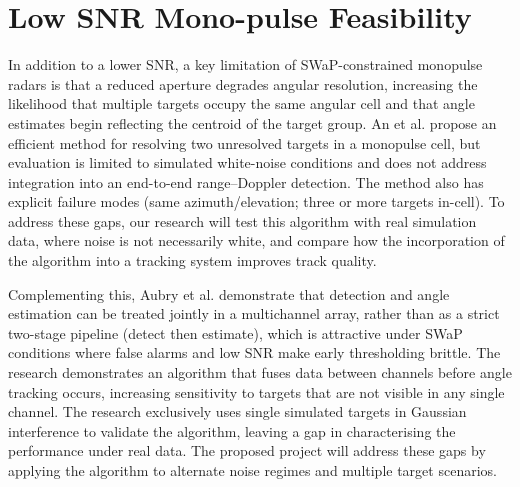 \section{Low SNR Mono-pulse Feasibility}

In addition to a lower SNR, a key limitation of SWaP-constrained monopulse radars is that a reduced aperture degrades angular resolution, increasing the likelihood that multiple targets occupy the same angular cell and that angle estimates begin reflecting the centroid of the target group. An et al. \cite{an2024_time_varying_angle_estimation_unresolved_extended_targets_monopulse} propose an efficient method for resolving two unresolved targets in a monopulse cell, but evaluation is limited to simulated white-noise conditions and does not address integration into an end-to-end range–Doppler detection. The method also has explicit failure modes (same azimuth/elevation; three or more targets in-cell). To address these gaps, our research will test this algorithm with real simulation data, where noise is not necessarily white, and compare how the incorporation of the algorithm into a tracking system improves track quality. 

Complementing this, Aubry et al. \cite{aubry2020_single_pulse_simultaneous_detection_angle_estimation_multichannel} demonstrate that detection and angle estimation can be treated jointly in a multichannel array, rather than as a strict two-stage pipeline (detect then estimate), which is attractive under SWaP conditions where false alarms and low SNR make early thresholding brittle. The research demonstrates an algorithm that fuses data between channels before angle tracking occurs, increasing sensitivity to targets that are not visible in any single channel. The research exclusively uses single simulated targets in Gaussian interference to validate the algorithm, leaving a gap in characterising the performance under real data. The proposed project will address these gaps by applying the algorithm to alternate noise regimes and multiple target scenarios. 
